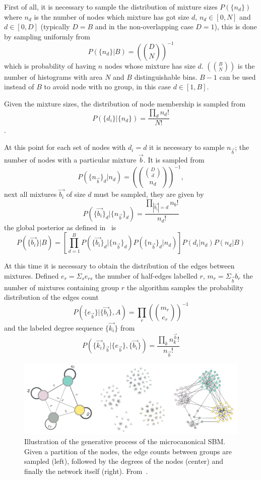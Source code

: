 First of all, it is necessary to sample the distribution of mixture sizes
$P(\{n_d\})$ where $n_d$ is the number of nodes which mixture has got size $d$, $n_d\in[0,N]$ and $d\in[0,D]$ (typically $D=B$
and in the non-overlapping case $D=1$), this is done by sampling uniformly from
\[P(\{n_d\}|B)=\left(\binom{D}{N}\right)^{-1}\] which is probability of having $n$ nodes whose mixture has size $d$.
$\left(\binom{B}{N}\right)$ is the number of histograms with
area $N$ and $B$ distinguishable bins. $B-1$ can be used instead of $B$ to avoid node with no group, in this case $d\in[1,B]$.

Given the mixture sizes, the distribution of node membership
is sampled from \[P(\{d_i\}|\{n_d\})=\frac{\prod_{d} n_d!}{N!}\].

At this point for each set of nodes with $d_i=d$ it is necessary to sample $n_{\vec{b}}$; the number of nodes
with a particular mixture $\vec{b}$.
It is sampled from
\begin{equation}
  P(\{n_{\vec{b}}\}_d|n_d)=\left(\binom{\binom{D}{d}}{n_d}\right)^{-1},
\end{equation}
next all mixtures $\vec{b_i}$ of size $d$ must be sampled, they are given by
\begin{equation}
  P(\{\vec{b_i}\}_d|\{n_{\vec{b}}\}_d)=\frac{\prod_{|\vec{b_i}|=d} n_b!}{n_d!}
\end{equation}
the global posterior as defined in~\cite{peixoto2015model} is
\begin{equation}
  P(\{\vec{b_i}\}|B)=\left[\prod_{d=1}^B  P(\{\vec{b_i}\}_d|\{n_{\vec{b}}\}_d) P(\{n_{\vec{b}}\}_d|n_d)\right]P({d_i}|{n_d})P(n_d|B)
\end{equation}

At this time it is necessary to obtain the distribution of the edges between
mixtures. Defined $e_r=\Sigma_s e_{rs}$ the number of half-edges labelled $r$,
$m_r=\Sigma_{\vec{b}} b_r$ the number of mixtures containing group $r$ the
algorithm samples the probability distribution of the edges count
\[P(\{e_{\vec{b}}\}|\{\vec{b_i}\}, A)=\prod_r\left(\binom{m_r}{e_r}\right)^{-1}\] and the
labeled degree sequence $\{\vec{k_i}\}$ from
\[P(\{\vec{k_i}\}_{\vec{b}}|\{e_{\vec{b}}\}, \{\vec{b_i}\})=\frac{\prod_k n_k^{\vec{b}}!}{n_{\vec{b}}!}\]
\begin{figure}[htb]
	\centering
	\includegraphics[width=0.8\linewidth]{pictures/topic/peixioto_passages.png}
	\caption{Illustration of the generative process of the microcanonical SBM. Given a partition of the
		nodes, the edge counts between groups are sampled (left), followed by the degrees of the nodes (center) and finally
		the network itself (right). From~\cite{Peixoto2017}.}
	\label{fig:hsbm-sum}
\end{figure}

